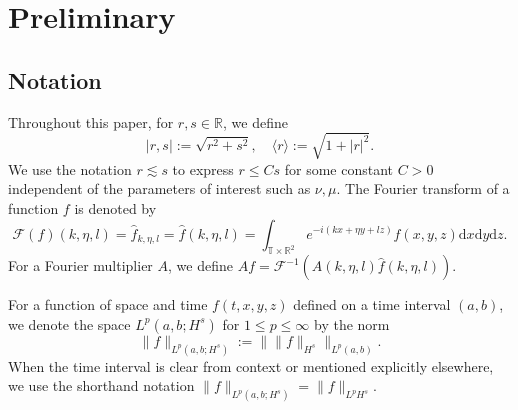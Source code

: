 \documentclass[12pt]{article}
\numberwithin{equation}{section}
\begin{document}
    
    \section{Preliminary}
    \subsection{Notation}
    Throughout this paper, for $r,s \in\mathbb{R}$, we define
	\begin{equation*}
		|r,  s |:=\sqrt{r^2+s^2},\quad\langle r \rangle:=\sqrt{1+|r|^2}.
	\end{equation*}
	We use the notation $r\lesssim s$ to express $r\leq Cs$ for some constant $C>0$ independent of the parameters of interest such as $\nu,\mu$. The Fourier transform of a function $f$ is denoted by
	\begin{equation*}
		\mathcal{F}(f)(k,\eta,l)=\hat{f}_{k,\eta,l}=\hat{f}(k,\eta,l)=\int_{\mathbb{T}\times\mathbb{R}^2}e^{-i(kx+\eta y+lz)}f(x,y,z)\mathrm{d}x\mathrm{d}y\mathrm{d}z.
	\end{equation*}
	For a Fourier multiplier $A$, we define $Af=\mathcal{F}^{-1}(A(k,\eta,l)\hat{f}(k,\eta,l))$. 
	
	For a function of space and time $f(t,x,y,z)$ defined on a time interval $(a,b)$, we denote the space $L^p(a,b;H^s)$ for $1\leq p\leq\infty$ by the norm
	\begin{equation*}
		\|f\|_{L^p(a,b;H^s)}:=\|\|f\|_{H^s}\|_{L^p(a,b)}.
	\end{equation*}
	When the time interval is clear from context or mentioned explicitly elsewhere, we use the shorthand notation $\|f\|_{L^p(a,b;H^s)}=\|f\|_{L^p H^s}$.
\end{document}
